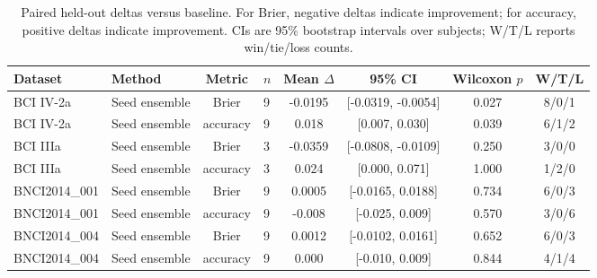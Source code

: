 \begin{table}[t]
\centering
\caption{Paired held-out deltas versus baseline. For Brier, negative deltas indicate improvement; for accuracy, positive deltas indicate improvement. CIs are 95\% bootstrap intervals over subjects; W/T/L reports win/tie/loss counts.}
\label{tab:paired-stats}
\begin{tabular}{llclcccc}
\toprule
Dataset & Method & Metric & $n$ & Mean $\Delta$ & 95\% CI & Wilcoxon $p$ & W/T/L \\
\midrule
BCI IV-2a & Seed ensemble & Brier & 9 & -0.0195 & [-0.0319, -0.0054] & 0.027 & 8/0/1 \\
BCI IV-2a & Seed ensemble & accuracy & 9 & 0.018 & [0.007, 0.030] & 0.039 & 6/1/2 \\
BCI IIIa & Seed ensemble & Brier & 3 & -0.0359 & [-0.0808, -0.0109] & 0.250 & 3/0/0 \\
BCI IIIa & Seed ensemble & accuracy & 3 & 0.024 & [0.000, 0.071] & 1.000 & 1/2/0 \\
BNCI2014\_001 & Seed ensemble & Brier & 9 & 0.0005 & [-0.0165, 0.0188] & 0.734 & 6/0/3 \\
BNCI2014\_001 & Seed ensemble & accuracy & 9 & -0.008 & [-0.025, 0.009] & 0.570 & 3/0/6 \\
BNCI2014\_004 & Seed ensemble & Brier & 9 & 0.0012 & [-0.0102, 0.0161] & 0.652 & 6/0/3 \\
BNCI2014\_004 & Seed ensemble & accuracy & 9 & 0.000 & [-0.010, 0.009] & 0.844 & 4/1/4 \\
\bottomrule
\end{tabular}
\end{table}
